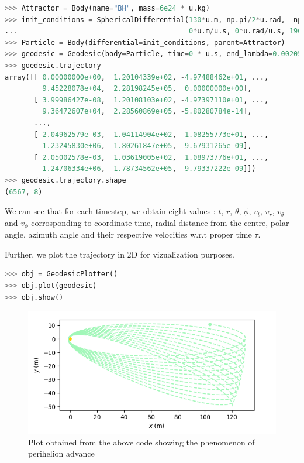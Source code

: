 \documentclass{aastex63}
\begin{document}
\begin{lstlisting}[language=Python, caption=Defining the attractor and the particle and calculating geodesics]
>>> Attractor = Body(name="BH", mass=6e24 * u.kg)
>>> init_conditions = SphericalDifferential(130*u.m, np.pi/2*u.rad, -np.pi/8*u.rad,
...                                         0*u.m/u.s, 0*u.rad/u.s, 1900*u.rad/u.s)
>>> Particle = Body(differential=init_conditions, parent=Attractor)
>>> geodesic = Geodesic(body=Particle, time=0 * u.s, end_lambda=0.00205, step_size=5e-8)
>>> goedesic.trajectory
array([[ 0.00000000e+00,  1.20104339e+02, -4.97488462e+01, ...,
         9.45228078e+04,  2.28198245e+05,  0.00000000e+00],
       [ 3.99986427e-08,  1.20108103e+02, -4.97397110e+01, ...,
         9.36472607e+04,  2.28560869e+05, -5.80280784e-14],
       ...,
       [ 2.04962579e-03,  1.04114904e+02,  1.08255773e+01, ...,
        -1.23245830e+06,  1.80261847e+05, -9.67931265e-09],
       [ 2.05002578e-03,  1.03619005e+02,  1.08973776e+01, ...,
        -1.24706334e+06,  1.78734562e+05, -9.79337222e-09]])
>>> geodesic.trajectory.shape
(6567, 8)
\end{lstlisting}
We can see that for each timestep, we obtain eight values : $t$, $r$, $\theta$, $\phi$, $v_t$, $v_r$, $v_\theta$ and $v_\phi$ corrosponding to coordinate time, radial distance from the centre, polar angle, azimuth angle and their respective velocities w.r.t proper time $\tau$.

Further, we plot the trajectory in 2D for vizualization purposes.
\begin{lstlisting}[language=Python, caption=Plotting the trajectory]
>>> obj = GeodesicPlotter()
>>> obj.plot(geodesic)
>>> obj.show()
\end{lstlisting}

\begin{figure}[h]
	\centering
	\includegraphics[scale=0.7]{images/perihelion_cropped.png}
	\caption{Plot obtained from the above code showing the phenomenon of perihelion advance}
	\label{fig:schwarzschild}
\end{figure}
\end{document}
